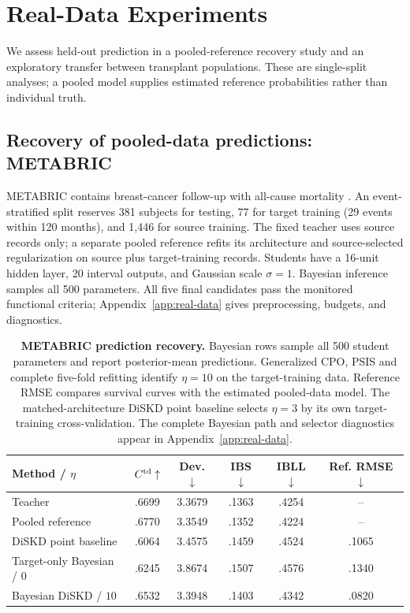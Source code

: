 \documentclass{article} %
\begin{document}
\section{Real-Data Experiments}
\label{sec:real-data}
We assess held-out prediction in a pooled-reference recovery study and an exploratory transfer between transplant populations. These are single-split analyses; a pooled model supplies estimated reference probabilities rather than individual truth.

\subsection{Recovery of pooled-data predictions: METABRIC}
\label{sec:real-pooled}
METABRIC contains breast-cancer follow-up with all-cause mortality \citep{katzman2018deepsurv}. An event-stratified split reserves 381 subjects for testing, 77 for target training (29 events within 120 months), and 1,446 for source training. The fixed teacher uses source records only; a separate pooled reference refits its architecture and source-selected regularization on source plus target-training records. Students have a 16-unit hidden layer, 20 interval outputs, and Gaussian scale $\sigma=1$. Bayesian inference samples all 500 parameters. All five final candidates pass the monitored functional criteria; Appendix~\ref{app:real-data} gives preprocessing, budgets, and diagnostics.

\begin{table}[!htbp]
\centering\footnotesize
\caption{\textbf{METABRIC prediction recovery.} Bayesian rows sample all 500 student parameters and report posterior-mean predictions. Generalized CPO, PSIS and complete five-fold refitting identify $\eta=10$ on the target-training data. Reference RMSE compares survival curves with the estimated pooled-data model. The matched-architecture DiSKD point baseline selects $\eta=3$ by its own target-training cross-validation. The complete Bayesian path and selector diagnostics appear in Appendix~\ref{app:real-data}.}
\label{tab:real-metabric}
\setlength{\tabcolsep}{4pt}
\begin{tabular}{@{}lccccc@{}}
\toprule
Method / $\eta$ & $C^{\rm td}\uparrow$ & Dev. $\downarrow$ & IBS $\downarrow$ & IBLL $\downarrow$ & Ref. RMSE $\downarrow$\\
\midrule
Teacher & .6699 & 3.3679 & .1363 & .4254 & --\\
Pooled reference & .6770 & 3.3549 & .1352 & .4224 & --\\
DiSKD point baseline & .6064 & 3.4575 & .1459 & .4524 & .1065\\
\midrule
Target-only Bayesian / $0$ & .6245 & 3.8674 & .1507 & .4576 & .1340\\
Bayesian DiSKD / $10$ & .6532 & 3.3948 & .1403 & .4342 & .0820\\
\bottomrule
\end{tabular}
\end{table}
\end{document}
